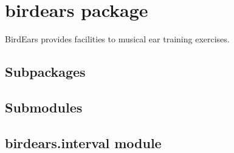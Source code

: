 \documentclass[letterpaper,10pt,english]{sphinxmanual}
\begin{document}
\chapter{birdears package}
\label{\detokenize{index:module-birdears}}\label{\detokenize{index:birdears-package}}
BirdEars provides facilities to musical ear training exercises.


\section{Subpackages}
\label{\detokenize{index:subpackages}}

\section{Submodules}
\label{\detokenize{index:submodules}}

\section{birdears.interval module}
\label{\detokenize{index:birdears-interval-module}}\label{\detokenize{index:module-birdears.interval}}
\end{document}
